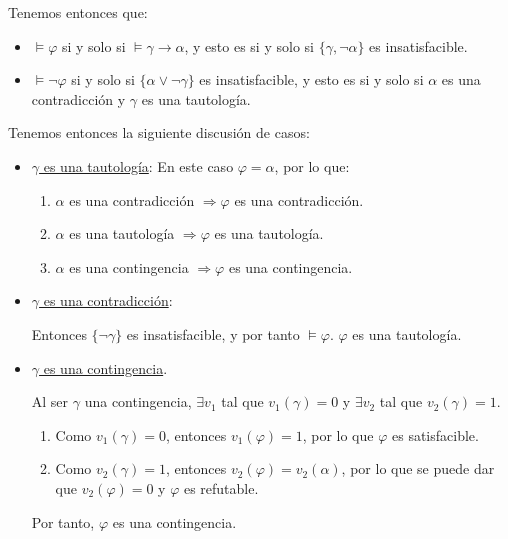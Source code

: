 \begin{ejercicio}
    Tenemos entonces que:
    \begin{itemize}
        \item $\models \varphi$ si y solo si $\models \gamma\rightarrow \alpha$, y esto es si y solo si $\{\gamma,\lnot \alpha\}$ es insatisfacible.
        \item $\models \lnot \varphi$ si y solo si $\{\alpha\lor \lnot \gamma\}$ es insatisfacible,
        y esto es si y solo si $\alpha$ es una contradicción y $\gamma$ es una tautología.
    \end{itemize}

    Tenemos entonces la siguiente discusión de casos:
    \begin{itemize}
        \item \ul{$\gamma$ es una tautología}: En este caso $\varphi=\alpha$, por lo que:
        \begin{enumerate}
            \item $\alpha$ es una contradicción $\Longrightarrow \varphi$ es una contradicción.
            \item $\alpha$ es una tautología $\Longrightarrow \varphi$ es una tautología.
            \item $\alpha$ es una contingencia $\Longrightarrow \varphi$ es una contingencia.
        \end{enumerate}
        \item \ul{$\gamma$ es una contradicción}:
        
        Entonces $\{\lnot \gamma\}$ es insatisfacible, y por tanto $\models \varphi$. $\varphi$ es una tautología.

        \item \ul{$\gamma$ es una contingencia}. 
        
        Al ser $\gamma$ una contingencia, $\exists v_1$ tal que $v_1(\gamma)=0$ y $\exists v_2$ tal que $v_2(\gamma)=1$.
        \begin{enumerate}
            \item Como $v_1(\gamma)=0$, entonces $v_1(\varphi)=1$, por lo que $\varphi$ es satisfacible.
            \item Como $v_2(\gamma)=1$, entonces $v_2(\varphi)=v_2(\alpha)$, por lo que se puede dar que $v_2(\varphi)=0$ y $\varphi$ es refutable.
        \end{enumerate}

        Por tanto, $\varphi$ es una contingencia.
    \end{itemize}
\end{ejercicio}

